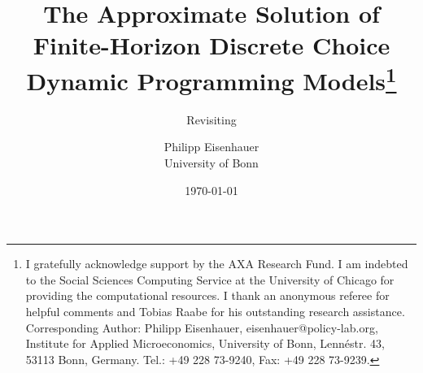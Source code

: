 \title{The Approximate Solution of Finite-Horizon Discrete Choice Dynamic Programming Models\thanks{I gratefully acknowledge support by the AXA Research Fund. I am indebted to the Social Sciences Computing Service at the University of Chicago for providing the computational resources. I thank an anonymous referee for helpful comments and Tobias Raabe for his outstanding research assistance. Corresponding Author: Philipp Eisenhauer, eisenhauer@policy-lab.org, Institute for Applied Microeconomics, University of Bonn, Lenn\'{e}str. 43, 53113 Bonn, Germany. Tel.: +49 228 73-9240, Fax: +49 228 73-9239.}}
\subtitle{Revisiting  \citet{Keane.1994}}

\author{Philipp Eisenhauer\\
University of Bonn}
\date{\today}
